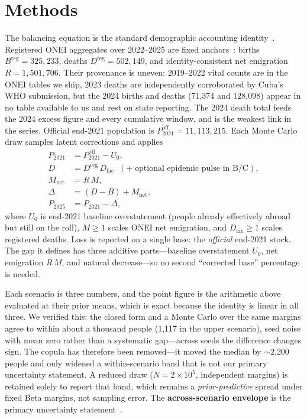 \documentclass[11pt,a4paper]{article}
\begin{document}
\section{Methods}

The balancing equation is the standard demographic accounting identity~\citep{preston2001}.
Registered ONEI aggregates over 2022--2025 are fixed anchors~\citep{onei_2025}: births $B^{\mathrm{reg}}=325{,}233$, deaths $D^{\mathrm{reg}}=502{,}149$, and identity-consistent net emigration $R=1{,}501{,}706$.
Their provenance is uneven: 2019--2022 vital counts are in the ONEI tables we ship, 2023 deaths are independently corroborated by Cuba's WHO submission, but the 2024 births and deaths (71{,}374 and 128{,}098) appear in no table available to us and rest on state reporting. The 2024 death total feeds the 2024 excess figure and every cumulative window, and is the weakest link in the series.
Official end-2021 population is $P^{\mathrm{off}}_{2021}=11{,}113{,}215$.
Each Monte Carlo draw samples latent corrections and applies
\begin{align}
P_{2021} &= P^{\mathrm{off}}_{2021} - U_0, \\
D &= D^{\mathrm{reg}}\,D_{\mathrm{fac}} \;\;(+\;\text{optional epidemic pulse in B/C}), \\
M_{\mathrm{net}} &= R\,M, \\
\Delta &= (D - B) + M_{\mathrm{net}}, \\
P_{2025} &= P_{2021} - \Delta,
\end{align}
where $U_0$ is end-2021 baseline overstatement (people already effectively abroad but still on the roll),
$M\ge 1$ scales ONEI net emigration, and $D_{\mathrm{fac}}\ge 1$ scales registered deaths.
Loss is reported on a single base: the \emph{official} end-2021 stock.
The gap it defines has three additive parts---baseline overstatement $U_0$, net emigration $R\,M$, and natural decrease---so no second ``corrected base'' percentage is needed.

Each scenario is three numbers, and the point figure is the arithmetic above evaluated at their prior means, which is exact because the identity is linear in all three.
We verified this: the closed form and a Monte Carlo over the same margins agree to within about a thousand people (1{,}117 in the upper scenario), seed noise with mean zero rather than a systematic gap---across seeds the difference changes sign.
The copula has therefore been removed---it moved the median by $\sim$2{,}200 people and only widened a within-scenario band that is not our primary uncertainty statement.
A reduced draw ($N=2\times10^5$, independent margins) is retained solely to report that band, which remains a \emph{prior-predictive} spread under fixed Beta margins, not sampling error.
The \textbf{across-scenario envelope} is the primary uncertainty statement~\citep{repo,modeld}.
\end{document}
